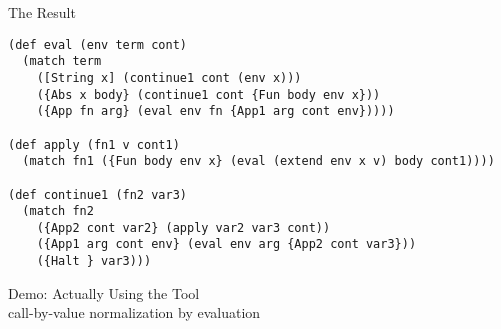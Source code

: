 \documentclass{beamer}
\newcommand{\LC}{\(\lambda\)-calculus}
\begin{document}
\begin{frame}[fragile]{The Result}
  \begin{lstlisting}
(def eval (env term cont)
  (match term
    ([String x] (continue1 cont (env x)))
    ({Abs x body} (continue1 cont {Fun body env x}))
    ({App fn arg} (eval env fn {App1 arg cont env}))))

(def apply (fn1 v cont1)
  (match fn1 ({Fun body env x} (eval (extend env x v) body cont1))))

(def continue1 (fn2 var3)
  (match fn2
    ({App2 cont var2} (apply var2 var3 cont))
    ({App1 arg cont env} (eval env arg {App2 cont var3}))
    ({Halt } var3)))
  \end{lstlisting}
\end{frame}

\begin{frame}
  \centering
  \LARGE{Demo: Actually Using the Tool}\\
  \small{call-by-value normalization by evaluation}
\end{frame}

\end{document}
